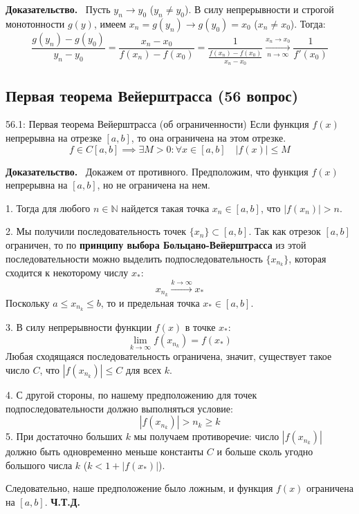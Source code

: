 \documentclass[a4paper,12pt]{article}
\newcommand{\myproof}{\textbf{Доказательство.}\ }
\begin{document}
	\vspace{0.5cm}
	\myproof
	Пусть $y_n \to y_0$ ($y_n \neq y_0$). В силу непрерывности и строгой монотонности $g(y)$, имеем $x_n = g(y_n) \to g(y_0) = x_0$ ($x_n \neq x_0$).
	Тогда:
	$$ \frac{g(y_n) - g(y_0)}{y_n - y_0} = \frac{x_n - x_0}{f(x_n) - f(x_0)} = \frac{1}{\frac{f(x_n) - f(x_0)}{x_n - x_0}} \xrightarrow[n \to \infty]{x_n \to x_0} \frac{1}{f'(x_0)} $$
	
	

	
	\newpage
	\subsection{Первая теорема Вейерштрасса (56 вопрос)}
	
	\begin{theorembox}{56.1: Первая теорема Вейерштрасса (об ограниченности)}
		Если функция $f(x)$ непрерывна на отрезке $[a, b]$, то она ограничена на этом отрезке.
		$$ f \in C[a, b] \implies \exists M > 0 : \forall x \in [a, b] \quad |f(x)| \leq M $$
	\end{theorembox}
	
	\vspace{0.5cm}
	\myproof
	Докажем от противного. Предположим, что функция $f(x)$ непрерывна на $[a, b]$, но не ограничена на нем.
	
	1. Тогда для любого $n \in \mathbb{N}$ найдется такая точка $x_n \in [a, b]$, что $|f(x_n)| > n$.
	
	2. Мы получили последовательность точек $\{x_n\} \subset [a, b]$. Так как отрезок $[a, b]$ ограничен, то по \textbf{принципу выбора Больцано-Вейерштрасса} из этой последовательности можно выделить подпоследовательность $\{x_{n_k}\}$, которая сходится к некоторому числу $x_*$:
	$$ x_{n_k} \xrightarrow{k \to \infty} x_* $$
	Поскольку $a \leq x_{n_k} \leq b$, то и предельная точка $x_* \in [a, b]$.
	
	3. В силу непрерывности функции $f(x)$ в точке $x_*$:
	$$ \lim_{k \to \infty} f(x_{n_k}) = f(x_*) $$
	Любая сходящаяся последовательность ограничена, значит, существует такое число $C$, что $|f(x_{n_k})| \leq C$ для всех $k$.
	
	4. С другой стороны, по нашему предположению для точек подпоследовательности должно выполняться условие:
	$$ |f(x_{n_k})| > n_k \geq k $$
	5. При достаточно больших $k$ мы получаем противоречие: число $|f(x_{n_k})|$ должно быть одновременно меньше константы $C$ и больше сколь угодно большого числа $k$ ($k < 1 + |f(x_*)|$).
	
	Следовательно, наше предположение было ложным, и функция $f(x)$ ограничена на $[a, b]$. \textbf{Ч.Т.Д.}
	
\end{document}
